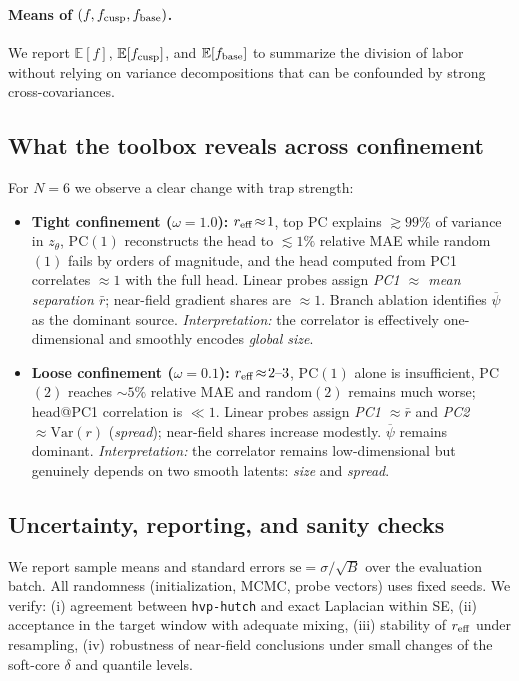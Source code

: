 \paragraph{Means of $(f,f_{\rm cusp},f_{\rm base})$.}
We report $\mathbb{E}[f]$, $\mathbb{E}[f_{\rm cusp}]$, and $\mathbb{E}[f_{\rm base}]$ to summarize the division of labor without relying on variance decompositions that can be confounded by strong cross-covariances.

\subsection{What the toolbox reveals across confinement}
\label{subsec:omega-story}
For $N=6$ we observe a clear change with trap strength:
\begin{itemize}
  \item \textbf{Tight confinement ($\omega=1.0$):} $r_{\rm eff}\!\approx\!1$, top PC explains $\gtrsim\!99\%$ of variance in $z_\theta$, PC$(1)$ reconstructs the head to $\lesssim\!1\%$ relative MAE while random$(1)$ fails by orders of magnitude, and the head computed from PC1 correlates $\approx\!1$ with the full head. Linear probes assign \emph{PC1 $\approx$ mean separation $\bar r$}; near-field gradient shares are $\approx\!1$. Branch ablation identifies $\overline\psi$ as the dominant source. \emph{Interpretation:} the correlator is effectively one-dimensional and smoothly encodes \emph{global size}.
  \item \textbf{Loose confinement ($\omega=0.1$):} $r_{\rm eff}\!\approx\!2\text{–}3$, PC$(1)$ alone is insufficient, PC$(2)$ reaches $\sim\!5\%$ relative MAE and random$(2)$ remains much worse; head@PC1 correlation is $\ll 1$. Linear probes assign \emph{PC1 $\approx \bar r$} and \emph{PC2 $\approx \mathrm{Var}(r)$} (\emph{spread}); near-field shares increase modestly. $\overline\psi$ remains dominant. \emph{Interpretation:} the correlator remains low-dimensional but genuinely depends on two smooth latents: \emph{size} and \emph{spread}.
\end{itemize}

\subsection{Uncertainty, reporting, and sanity checks}
We report sample means and standard errors $\mathrm{se}=\sigma/\sqrt{B}$ over the evaluation batch. All randomness (initialization, MCMC, probe vectors) uses fixed seeds. We verify:
(i) agreement between \texttt{hvp-hutch} and exact Laplacian within SE,
(ii) acceptance in the target window with adequate mixing,
(iii) stability of $r_{\rm eff}$ under resampling,
(iv) robustness of near-field conclusions under small changes of the soft-core $\delta$ and quantile levels.

